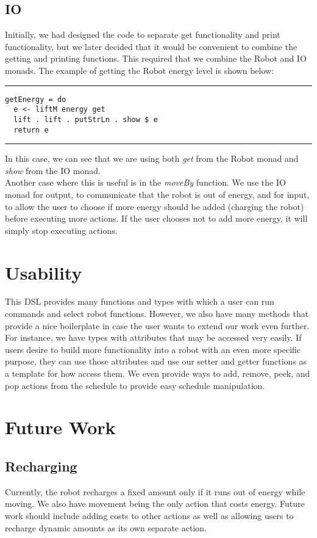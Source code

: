 \documentclass{sig-alternate-05-2015}
\begin{document}
\subsection{IO}
Initially, we had designed the code to separate get functionality and print functionality, but we later decided that it would be convenient to combine the getting and printing functions. This required that we combine the Robot and IO monads. The example of getting the Robot energy level is shown below:
\bigskip
\hrule
\begin{lstlisting}
getEnergy = do
  e <- liftM energy get
  lift . lift . putStrLn . show $ e
  return e
\end{lstlisting}
\hrule
\bigskip

In this case, we can see that we are using both \textit{get} from the Robot monad and \textit{show} from the IO monad. \\

Another case where this is useful is in the \textit{moveBy} function. We use the IO monad for output, to communicate that the robot is out of energy, and for input, to allow the user to choose if more energy should be added (charging the robot) before executing more actions. If the user chooses not to add more energy, it will simply stop executing actions.

\section{Usability}
This DSL provides many functions and types with which a user can run commands and select robot functions. However, we also have many methods that provide a nice boilerplate in case the user wants to extend our work even further. For instance, we have types with attributes that may be accessed very easily. If users desire to  build more functionality into a robot with an even more specific purpose, they can use those attributes and use our setter and getter functions as a template for how access them. We even provide ways to add, remove, peek, and pop actions from the schedule to provide easy schedule manipulation.

\section{Future Work}
\subsection{Recharging}
Currently, the robot recharges a fixed amount only if it runs out of energy while moving. We also have movement being the only action that costs energy. Future work should include adding costs to other actions as well as allowing users to recharge dynamic amounts as its own separate action.
\end{document}

